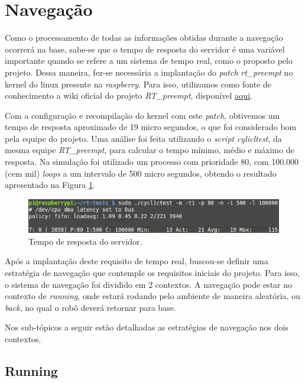 \section{Navegação} %
\label{sec:navegação2}
	
	Como o processamento de todas as informações obtidas durante a navegação ocorrerá na base, sabe-se que o tempo de resposta do servidor é uma variável importante quando se refere a um sistema de tempo real, como o proposto pelo projeto. Dessa maneira, fez-se necessária a implantação do \textit{patch} \textit{rt\_preempt} no kernel do linux presente na \textit{raspberry}. Para isso, utilizamos como fonte de conhecimento a wiki oficial do projeto \textit{RT\_preempt}, disponível \href{https://rt.wiki.kernel.org/index.php/Main_Page}{aqui}.

	Com a configuração e recompilação do kernel com este \textit{patch}, obtivemos um tempo de resposta aproximado de 19 micro segundos, o que foi considerado bom pela equipe do projeto. Uma análise foi feita utilizando o \textit{script} \textit{cylicltest}, da mesma equipe \textit{RT\_preempt}, para calcular o tempo mínimo, médio e máximo de resposta. Na simulação foi utilizado um processo com prioridade 80, com 100.000 (cem mil) \textit{loops} a um intervalo de 500 micro segundos, obtendo o resultado apresentado na Figura \ref{img:tempo_de_resposta}.

	\begin{figure}[H]
		\centering
		\includegraphics[scale=0.7]{figuras/tempo_de_resposta.png}
		\caption{Tempo de resposta do servidor.}
		\label{img:tempo_de_resposta}
	\end{figure}

	Após a implantação deste requisito de tempo real, buscou-se definir uma estratégia de navegação que contemple os requisitos iniciais do projeto. Para isso, o sistema de navegação foi dividido em 2 contextos. A navegação pode estar no contexto de \textit{running}, onde estará rodando pelo ambiente de maneira aleatória, ou \textit{back}, no qual o robô deverá retornar para base.

	Nos sub-tópicos a seguir estão detalhadas as estratégias de navegação nos dois contextos.

	\subsection{Running} %
	 \label{sub:running}
	 
